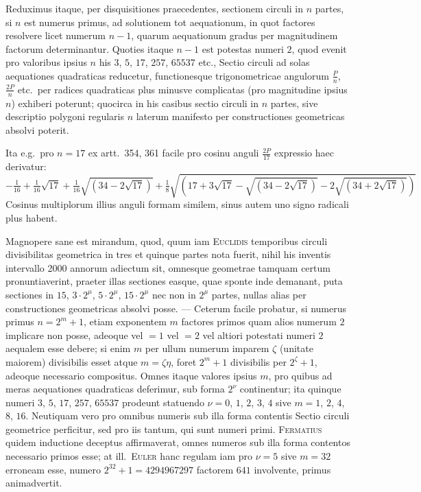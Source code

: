 \documentclass[12pt,a4paper]{article}
\theoremstyle{plain}
\theoremstyle{definition}
\theoremstyle{remark}
\begin{document}
Reduximus itaque, per disquisitiones praecedentes, sectionem circuli in $n$ partes, si $n$ est numerus primus, ad solutionem tot aequationum, in quot factores resolvere licet numerum $n-1$, quarum aequationum gradus per magnitudinem factorum determinantur. Quoties itaque $n-1$ est potestas numeri $2$, quod evenit pro valoribus ipsius $n$ his $3$, $5$, $17$, $257$, $65537$ etc., Sectio circuli ad solas aequationes quadraticas reducetur, functionesque trigonometricae angulorum $\tfrac{P}{n}$, $\tfrac{2P}{n}$ etc.\ per radices quadraticas plus minusve complicatas (pro magnitudine ipsius $n$) exhiberi poterunt; quocirca in his casibus sectio circuli in $n$ partes, sive descriptio polygoni regularis $n$ laterum manifesto per constructiones geometricas absolvi poterit.

Ita e.g.\ pro $n = 17$ ex artt.\ 354, 361 facile pro cosinu anguli $\tfrac{2P}{17}$ expressio haec derivatur:
\[-\tfrac{1}{16} + \tfrac{1}{16}\sqrt{17} + \tfrac{1}{16}\sqrt{(34 - 2\sqrt{17})} + \tfrac{1}{8}\sqrt{(17 + 3\sqrt{17} - \sqrt{(34 - 2\sqrt{17})} - 2\sqrt{(34 + 2\sqrt{17})})}\]
Cosinus multiplorum illius anguli formam similem, sinus autem uno signo radicali plus habent.

Magnopere sane est mirandum, quod, quum iam \textsc{Euclidis} temporibus circuli divisibilitas geometrica in tres et quinque partes nota fuerit, nihil his inventis intervallo 2000 annorum adiectum sit, omnesque geometrae tamquam certum pronuntiaverint, praeter illas sectiones easque, quae sponte inde demanant, puta sectiones in $15$, $3 \cdot 2^\mu$, $5 \cdot 2^\mu$, $15 \cdot 2^\mu$ nec non in $2^\mu$ partes, nullas alias per constructiones geometricas absolvi posse. --- Ceterum facile probatur, si numerus primus $n = 2^m + 1$, etiam exponentem $m$ factores primos quam alios numerum $2$ implicare non posse, adeoque vel $= 1$ vel $= 2$ vel altiori potestati numeri $2$ aequalem esse debere; si enim $m$ per ullum numerum imparem $\zeta$ (unitate maiorem) divisibilis esset atque $m = \zeta\eta$, foret $2^m + 1$ divisibilis per $2^\zeta + 1$, adeoque necessario compositus. Omnes itaque valores ipsius $m$, pro quibus ad meras aequationes quadraticas deferimur, sub forma $2^\nu$ continentur; ita quinque numeri $3$, $5$, $17$, $257$, $65537$ prodeunt statuendo $\nu = 0$, $1$, $2$, $3$, $4$ sive $m = 1$, $2$, $4$, $8$, $16$. Neutiquam vero pro omnibus numeris sub illa forma contentis Sectio circuli geometrice perficitur, sed pro iis tantum, qui sunt numeri primi. \textsc{Fermatius} quidem inductione deceptus affirmaverat, omnes numeros sub illa forma contentos necessario primos esse; at ill.\ \textsc{Euler} hanc regulam iam pro $\nu = 5$ sive $m = 32$ erroneam esse, numero $2^{32} + 1 = 4294967297$ factorem $641$ involvente, primus animadvertit.
\end{document}
